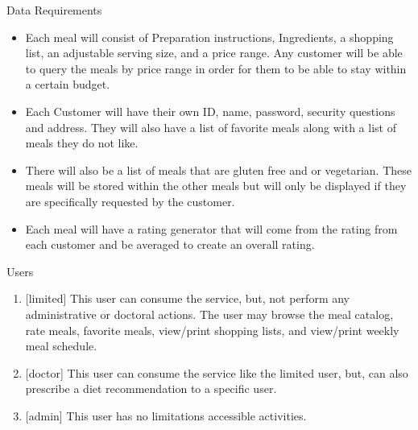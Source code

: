 \documentclass[a4paper,10pt,toc=graduated]{article}
\begin{document}
\begin{mySubsection}{Data Requirements}
\begin{itemize}
\item
Each meal will consist of Preparation instructions, Ingredients, a shopping list, an adjustable serving size, and a price range. Any customer will be able to query the meals by price range in order for them to be able to stay within a certain budget.
\item
Each Customer will have their own ID, name, password, security questions and address. They will also have a list of favorite meals along with a list of meals they do not like.
\item
There will also be a list of meals that are gluten free and or vegetarian. These meals will be stored within the other meals but will only be displayed if they are specifically requested by the customer.
\item
Each meal will have a rating generator that will come from the rating from each customer and be averaged to create an overall rating.
\end{itemize}
\end{mySubsection}
\begin{mySubsection}{Users}
\renewcommand{\labelenumi}{}
\renewcommand{\labelenumii}{}
\begin{enumerate}
\item {[limited]}
This user can consume the service, but, not perform any administrative or doctoral actions. The user may browse the meal catalog, rate meals, favorite meals, view/print shopping lists, and view/print weekly meal schedule.

\item {[doctor]}
This user can consume the service like the limited user, but, can also prescribe a diet recommendation to a specific user.

\item {[admin]}
This user has no limitations accessible activities.
\end{enumerate}
\end{mySubsection}
\end{document}

